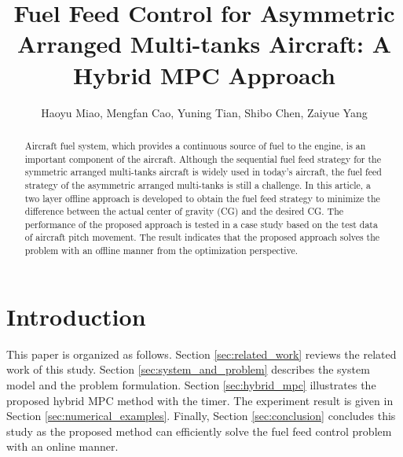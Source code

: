 \documentclass[english]{cccconf}
\begin{document}
\title{Fuel Feed Control for Asymmetric Arranged Multi-tanks Aircraft: A Hybrid MPC Approach}

\author{Haoyu Miao,
        Mengfan Cao,
        Yuning Tian,
        Shibo Chen,
        Zaiyue Yang}


\maketitle

\begin{abstract}
Aircraft fuel system, which provides a continuous source of fuel to the engine, is an important component of the aircraft.
Although the sequential fuel feed strategy for the symmetric arranged multi-tanks aircraft is widely used in today's aircraft, the fuel feed strategy of the asymmetric arranged multi-tanks is still a challenge.
In this article, a two layer offline approach is developed to obtain the fuel feed strategy to minimize the difference between the actual center of gravity (CG) and the desired CG.
The performance of the proposed approach is tested in a case study based on the test data of aircraft pitch movement. 
The result indicates that the proposed approach solves the problem with an offline manner from the optimization perspective.

\end{abstract}



\section{Introduction}

This paper is organized as follows.
Section \ref{sec:related_work} reviews the related work of this study.
Section \ref{sec:system_and_problem} describes the system model and the problem formulation.
Section \ref{sec:hybrid_mpc} illustrates the proposed hybrid MPC method with the timer.
The experiment result is given in Section \ref{sec:numerical_examples}.
Finally, Section \ref{sec:conclusion} concludes this study as the proposed method can efficiently solve the fuel feed control problem with an online manner.
\end{document}

